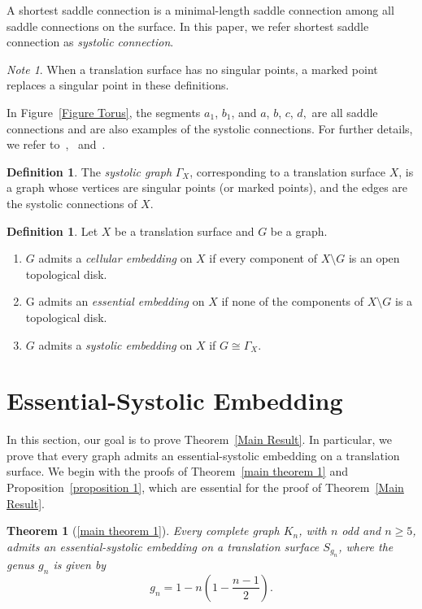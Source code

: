 \documentclass[11pt]{amsart}
\theoremstyle{plain}
\newtheorem*{repthm}{Theorem}
\theoremstyle{definition}
\newtheorem{definition}[theorem]{Definition}
\theoremstyle{remark}
\newtheorem{note}[theorem]{Note}
\numberwithin{equation}{section}
\numberwithin{figure}{section}
\begin{document}
A shortest saddle connection is a minimal-length saddle connection among all saddle connections on the surface. In this paper, we refer shortest saddle connection as \emph{systolic connection}.
\begin{note}
   When a translation surface has no singular points, a marked point replaces a singular point in these definitions.
\end{note}
In Figure~\ref{Figure Torus}, the segments $a_1$, $b_1$, and $a$, $b$, $c$, $d,$ are all saddle connections and are also examples of the systolic connections. For further details, we refer to~\cite{Mas22},~\cite{AR15} and~\cite{Masur06}.

\begin{definition}
The \emph{systolic graph} $\Gamma_X$, corresponding to a translation surface $X$, is a graph whose vertices are singular points (or marked points), and the edges are the systolic connections of $X$. 
\end{definition}

\begin{definition}
Let $X$ be a translation surface and $G$ be a graph.
\begin{enumerate}
\item  $G$ admits a \emph{cellular embedding} on $X$ if every component of $X\setminus G$ is an open topological disk.
\item G admits an \emph{essential embedding} on $X$ if none of the components of $X\setminus G$ is a topological disk.
\item  $G$ admits a \emph{systolic embedding} on $X$ if $G\cong \Gamma_X$.
\end{enumerate}
\end{definition}
\section{Essential-Systolic Embedding}
In this section, our goal is to prove Theorem~\ref{Main Result}. In particular, we prove that every graph admits an essential-systolic embedding on a translation surface. We begin with the proofs of Theorem~\ref{main theorem 1} and Proposition~\ref{proposition 1}, which are essential for the proof of Theorem~\ref{Main Result}.

\begin{repthm}[\ref{main theorem 1}]
    Every complete graph $K_n$, with $n$ odd and $n \geq 5$, admits an essential-systolic embedding on a translation surface $S_{g_n}$, where the genus $g_n$ is given by $$ g_n = 1 - n \left( 1 - \frac{n-1}{2} \right).$$
\end{repthm}
\end{document}
